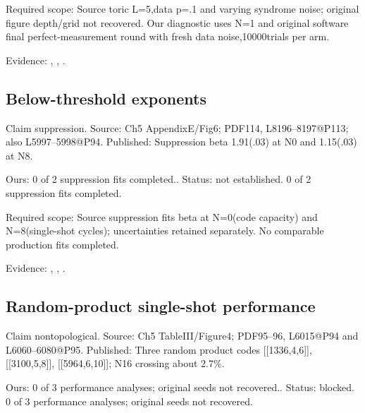 Required scope: Source toric L=5,data p=.1 and varying syndrome noise; original figure depth/grid not recovered. Our diagnostic uses N=1 and original software final perfect-measurement round with fresh data noise,10000trials per arm.

Evidence: \href{https://github.com/alectionary/vibe-math/blob/master/formalization/quintavalle-hgp/sources/browser-extraction.txt}{}, \href{https://github.com/alectionary/vibe-math/blob/master/formalization/quintavalle-hgp/availability.md}{}, \href{https://github.com/alectionary/vibe-math/blob/master/formalization/quintavalle-hgp/results/original_diagnostic_grid.json}{}.
\subsection{Below-threshold exponents}\label{claim:suppression}
Claim suppression. Source: Ch5 AppendixE/Fig6; PDF114, L8196--8197@P113; also L5997--5998@P94. Published: Suppression beta 1.91(.03) at N0 and 1.15(.03) at N8.

Ours: 0 of 2 suppression fits completed.. Status: not established. 0 of 2 suppression fits completed.

Required scope: Source suppression fits beta at N=0(code capacity) and N=8(single-shot cycles); uncertainties retained separately. No comparable production fits completed.

Evidence: \href{https://github.com/alectionary/vibe-math/blob/master/formalization/quintavalle-hgp/sources/browser-extraction.txt}{}, \href{https://github.com/alectionary/vibe-math/blob/master/formalization/quintavalle-hgp/availability.md}{}, \href{https://github.com/alectionary/vibe-math/blob/master/formalization/quintavalle-hgp/results/original_pilots.json}{}.
\subsection{Random-product single-shot performance}\label{claim:nontopological}
Claim nontopological. Source: Ch5 TableIII/Figure4; PDF95--96, L6015@P94 and L6060--6080@P95. Published: Three random product codes [[1336,4,6]], [[3100,5,8]], [[5964,6,10]]; N16 crossing about 2.7\%.

Ours: 0 of 3 performance analyses; original seeds not recovered.. Status: blocked. 0 of 3 performance analyses; original seeds not recovered.

